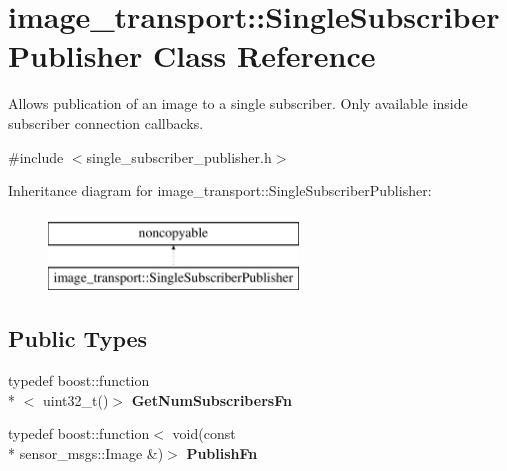 \hypertarget{classimage__transport_1_1_single_subscriber_publisher}{\section{image\-\_\-transport\-:\-:Single\-Subscriber\-Publisher Class Reference}
\label{classimage__transport_1_1_single_subscriber_publisher}
}


Allows publication of an image to a single subscriber. Only available inside subscriber connection callbacks.  




{\ttfamily \#include $<$single\-\_\-subscriber\-\_\-publisher.\-h$>$}

Inheritance diagram for image\-\_\-transport\-:\-:Single\-Subscriber\-Publisher\-:\begin{figure}[H]
\begin{center}
\leavevmode
\includegraphics[height=2.000000cm]{classimage__transport_1_1_single_subscriber_publisher}
\end{center}
\end{figure}
\subsection*{Public Types}
\begin{DoxyCompactItemize}
\item 
\hypertarget{classimage__transport_1_1_single_subscriber_publisher_a30045c60864ff22374f025a81c2ca9cf}{typedef boost\-::function\\*
$<$ uint32\-\_\-t()$>$ {\bfseries Get\-Num\-Subscribers\-Fn}}\label{classimage__transport_1_1_single_subscriber_publisher_a30045c60864ff22374f025a81c2ca9cf}

\item 
\hypertarget{classimage__transport_1_1_single_subscriber_publisher_a83df64c8c339546b94b059314c73d939}{typedef boost\-::function$<$ void(const \\*
sensor\-\_\-msgs\-::\-Image \&)$>$ {\bfseries Publish\-Fn}}\label{classimage__transport_1_1_single_subscriber_publisher_a83df64c8c339546b94b059314c73d939}

\end{DoxyCompactItemize}
